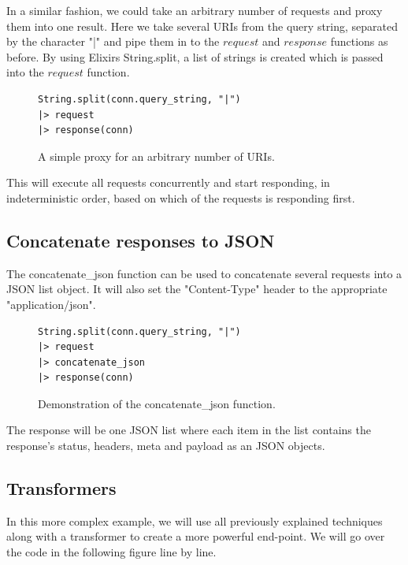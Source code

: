 \documentclass{cslthse-msc}
\begin{document}
In a similar fashion, we could take an arbitrary number of requests and proxy them into one result. Here we take several URIs from the query string, separated by the character "|" and pipe them in to the $request$ and $response$ functions as before. By using Elixirs String.split, a list of strings is created which is passed into the $request$ function.

\begin{figure}[H]
  \centering
\begin{lstlisting}[breaklines=true,frame=single]
String.split(conn.query_string, "|")
|> request
|> response(conn)
\end{lstlisting}
  \caption{A simple proxy for an arbitrary number of URIs.}
\end{figure}

This will execute all requests concurrently and start responding, in indeterministic order, based on which of the requests is responding first.

\subsection{Concatenate responses to JSON}
The concatenate\_json function can be used to concatenate several requests into a JSON list object. It will also set the "Content-Type" header to the appropriate "application/json".

\begin{figure}[H]
  \centering
\begin{lstlisting}[breaklines=true,frame=single]
String.split(conn.query_string, "|")
|> request
|> concatenate_json
|> response(conn)
\end{lstlisting}
  \caption{Demonstration of the concatenate\_json function.}
\end{figure}

The response will be one JSON list where each item  in the list contains the response's status, headers, meta and payload as an JSON objects.

\subsection{Transformers}
In this more complex example, we will use all previously explained techniques along with a transformer to create a more powerful end-point. We will go over the code in the following figure line by line.
\end{document}
